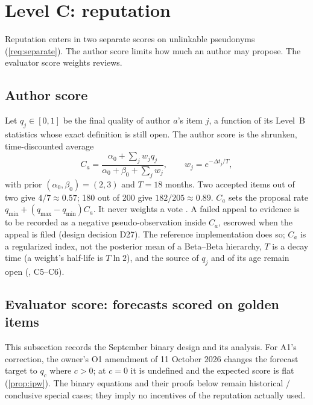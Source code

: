 \section{Level C: reputation}\label{sec:levelc}

Reputation enters in two separate scores on unlinkable pseudonyms (\cref{req:separate}). The
author score limits how much an author may propose. The evaluator score weights reviews.

\subsection{Author score}

Let $q_j\in[0,1]$ be the final quality of author $a$'s item $j$, a function of its Level~B
statistics whose exact definition is still open. The author score is the shrunken, time-discounted
average
\begin{equation}\label{eq:author}
  C_a=\frac{\alpha_0+\sum_j w_jq_j}{\alpha_0+\beta_0+\sum_j w_j},\qquad w_j=e^{-\Delta t_j/T},
\end{equation}
with prior $(\alpha_0,\beta_0)=(2,3)$ and $T=18$ months. Two accepted items out of two give
$4/7\approx0.57$; 180 out of 200 give $182/205\approx0.89$. $C_a$ sets the proposal rate
$q_{\min}+(q_{\max}-q_{\min})C_a$. It never weights a vote \designchoice. A failed appeal to
evidence is to be recorded as a negative pseudo-observation inside $C_a$, escrowed when the appeal
is filed (design decision D27). The reference implementation does so; $C_a$ is a regularized
index, not the posterior mean of a Beta--Beta hierarchy, $T$ is a decay time (a weight's
half-life is $T\ln 2$), and the source of $q_j$ and of its age remain open (, C5--C6).

\subsection{Evaluator score: forecasts scored on golden items}

This subsection records the September binary design and its analysis. For A1's correction,
the owner's O1 amendment of 11 October 2026 changes the forecast target to $q_c$ where $c>0$;
at $c=0$ it is undefined and the expected score is flat (\cref{prop:ipw}).
The binary equations and their proofs below remain historical / conclusive special cases;
they imply no incentives of the reputation actually used.

